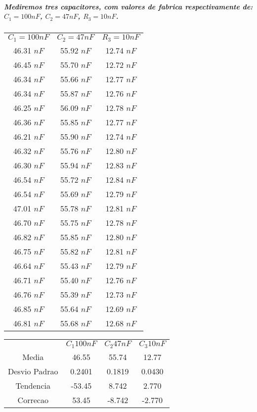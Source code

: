 \documentclass[12pt,twoside, a4paper, twocolumn]{article}
\begin{document}
\subparagraph*{Mediremos tres capacitores, com valores de fabrica respectivamente de: $C_1 = 100 nF$, $C_2 = 47 nF$, $R_3 = 10 nF$.}
\begin{center}
    \begin{tabular}{ |c|c|c| }
        \hline
        $C_1 = 100 nF$ & $C_2 = 47 nF$ & $R_3 = 10 nF$ \\
        46.31 $nF$     & 55.92 $nF$    & 12.74 $nF$    \\
        46.45 $nF$     & 55.70 $nF$    & 12.72 $nF$    \\
        46.34 $nF$     & 55.66 $nF$    & 12.77 $nF$    \\
        46.34 $nF$     & 55.87 $nF$    & 12.76 $nF$    \\
        46.25 $nF$     & 56.09 $nF$    & 12.78 $nF$    \\
        46.36 $nF$     & 55.85 $nF$    & 12.77 $nF$    \\
        46.21 $nF$     & 55.90 $nF$    & 12.74 $nF$    \\
        46.32 $nF$     & 55.76 $nF$    & 12.80 $nF$    \\
        46.30 $nF$     & 55.94 $nF$    & 12.83 $nF$    \\
        46.54 $nF$     & 55.72 $nF$    & 12.84 $nF$    \\
        46.54 $nF$     & 55.69 $nF$    & 12.79 $nF$    \\
        47.01 $nF$     & 55.78 $nF$    & 12.81 $nF$    \\
        46.70 $nF$     & 55.75 $nF$    & 12.78 $nF$    \\
        46.82 $nF$     & 55.85 $nF$    & 12.80 $nF$    \\
        46.75 $nF$     & 55.82 $nF$    & 12.81 $nF$    \\
        46.64 $nF$     & 55.43 $nF$    & 12.79 $nF$    \\
        46.71 $nF$     & 55.40 $nF$    & 12.76 $nF$    \\
        46.76 $nF$     & 55.39 $nF$    & 12.73 $nF$    \\
        46.85 $nF$     & 55.64 $nF$    & 12.69 $nF$    \\
        46.81 $nF$     & 55.68 $nF$    & 12.68 $nF$    \\

        \hline
    \end{tabular}
\end{center}

\begin{center}
    \begin{tabular}{ |c|c|c|c| }
        \hline
                      & $C_1 100 nF$ & $C_2 47 nF$ & $C_3 10 nF$ \\
        Media         & 46.55        & 55.74       & 12.77       \\
        Desvio Padrao & 0.2401       & 0.1819      & 0.0430      \\
        Tendencia     & -53.45       & 8.742       & 2.770       \\
        Correcao      & 53.45        & -8.742      & -2.770      \\
        \hline
    \end{tabular}
\end{center}
\end{document}
